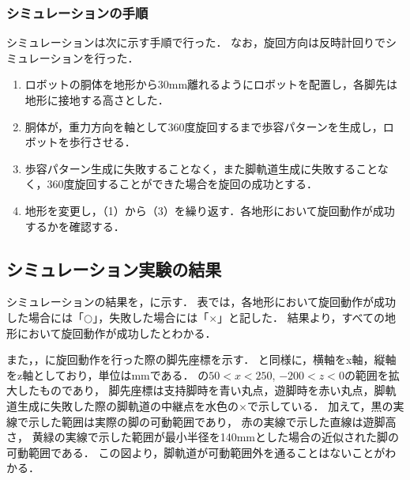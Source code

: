 \subsubsection{シミュレーションの手順}
シミュレーションは次に示す手順で行った．
なお，旋回方向は反時計回りでシミュレーションを行った．
\begin{enumerate}
  \item ロボットの胴体を地形から30mm離れるようにロボットを配置し，各脚先は地形に接地する高さとした．
  \item 胴体が，重力方向を軸として360度旋回するまで歩容パターンを生成し，ロボットを歩行させる．
  \item 歩容パターン生成に失敗することなく，また脚軌道生成に失敗することなく，360度旋回することができた場合を旋回の成功とする．
  \item 地形を変更し，（1）から（3）を繰り返す．各地形において旋回動作が成功するかを確認する．
\end{enumerate}

\subsection{シミュレーション実験の結果}
シミュレーションの結果を，に示す．
表では，各地形において旋回動作が成功した場合には「$\bigcirc$」，失敗した場合には「$\times$」と記した．
結果より，すべての地形において旋回動作が成功したとわかる．

また，，に旋回動作を行った際の脚先座標を示す．
と同様に，横軸をx軸，縦軸をz軸としており，単位はmmである．
の$50 < x < 250$, $−200 < z < 0$の範囲を拡大したものであり，
脚先座標は支持脚時を青い丸点，遊脚時を赤い丸点，脚軌道生成に失敗した際の脚軌道の中継点を水色の$\times$で示している．
加えて，黒の実線で示した範囲は実際の脚の可動範囲であり，
赤の実線で示した直線は遊脚高さ，
黄緑の実線で示した範囲が最小半径を140mmとした場合の近似された脚の可動範囲である．
この図より，脚軌道が可動範囲外を通ることはないことがわかる．
\\

